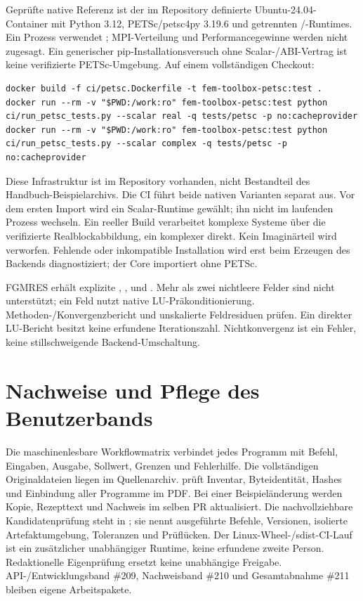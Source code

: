 Geprüfte native Referenz ist der im Repository definierte Ubuntu-24.04-
Container mit Python 3.12, PETSc/petsc4py 3.19.6 und getrennten
/-Runtimes. Ein Prozess verwendet
; MPI-Verteilung und Performancegewinne werden nicht
zugesagt. Ein generischer pip-Installationsversuch ohne Scalar-/ABI-Vertrag
ist keine verifizierte PETSc-Umgebung. Auf einem vollständigen Checkout:
\begin{lstlisting}
docker build -f ci/petsc.Dockerfile -t fem-toolbox-petsc:test .
docker run --rm -v "$PWD:/work:ro" fem-toolbox-petsc:test python ci/run_petsc_tests.py --scalar real -q tests/petsc -p no:cacheprovider
docker run --rm -v "$PWD:/work:ro" fem-toolbox-petsc:test python ci/run_petsc_tests.py --scalar complex -q tests/petsc -p no:cacheprovider
\end{lstlisting}
Diese Infrastruktur ist im Repository vorhanden, nicht Bestandteil des
Handbuch-Beispielarchivs. Die CI führt beide nativen Varianten separat aus.
Vor dem ersten Import wird ein Scalar-Runtime gewählt; ihn nicht im laufenden
Prozess wechseln. Ein reeller Build verarbeitet komplexe Systeme über die
verifizierte Realblockabbildung, ein komplexer direkt. Kein Imaginärteil
wird verworfen. Fehlende oder inkompatible Installation wird erst beim
Erzeugen des Backends diagnostiziert; der Core importiert ohne PETSc.

FGMRES erhält explizite , ,
 und . Mehr als zwei nichtleere Felder
sind nicht unterstützt; ein Feld nutzt native LU-Präkonditionierung.
Methoden-/Konvergenzbericht und unskalierte Feldresiduen prüfen.
Ein direkter LU-Bericht besitzt keine erfundene Iterationszahl.
Nichtkonvergenz ist ein Fehler, keine stillschweigende Backend-Umschaltung.

\section{Nachweise und Pflege des Benutzerbands}
Die maschinenlesbare Workflowmatrix  verbindet jedes
Programm mit Befehl, Eingaben, Ausgabe, Sollwert, Grenzen und Fehlerhilfe.
Die vollständigen Originaldateien liegen im Quellenarchiv.
 prüft Inventar, Byteidentität,
Hashes und Einbindung aller Programme im PDF. Bei einer Beispieländerung
werden Kopie, Rezepttext und Nachweis im selben PR aktualisiert.
Die nachvollziehbare Kandidatenprüfung steht in
; sie nennt ausgeführte Befehle,
Versionen, isolierte Artefaktumgebung, Toleranzen und Prüflücken.
Der Linux-Wheel-/sdist-CI-Lauf ist ein zusätzlicher unabhängiger Runtime,
keine erfundene zweite Person. Redaktionelle Eigenprüfung ersetzt keine
unabhängige Freigabe. API-/Entwicklungsband \#209, Nachweisband \#210 und
Gesamtabnahme \#211 bleiben eigene Arbeitspakete.
